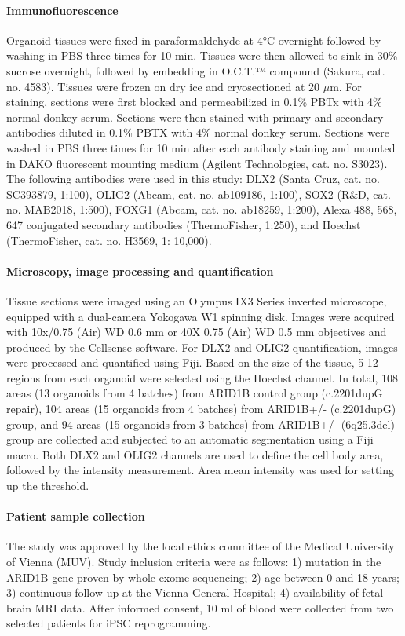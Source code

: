 \paragraph{Immunofluorescence}
Organoid tissues were fixed in paraformaldehyde at 4°C overnight followed by washing in PBS three times for 10 min. Tissues were then allowed to sink in 30\% sucrose overnight, followed by embedding in O.C.T.™ compound (Sakura, cat. no. 4583). Tissues were frozen on dry ice and cryosectioned at 20 $\mu$m. For staining, sections were first blocked and permeabilized in 0.1\% PBTx with 4\% normal donkey serum. Sections were then stained with primary and secondary antibodies diluted in 0.1\% PBTX with 4\% normal donkey serum. Sections were washed in PBS three times for 10 min after each antibody staining and mounted in DAKO fluorescent mounting medium (Agilent Technologies, cat. no. S3023). The following antibodies were used in this study: DLX2 (Santa Cruz, cat. no. SC393879, 1:100), OLIG2 (Abcam, cat. no. ab109186, 1:100), SOX2 (R\&D, cat. no. MAB2018, 1:500), FOXG1 (Abcam, cat. no. ab18259, 1:200), Alexa 488, 568, 647 conjugated secondary antibodies (ThermoFisher, 1:250), and Hoechst (ThermoFisher, cat. no. H3569, 1: 10,000).

\paragraph{Microscopy, image processing and quantification}
Tissue sections were imaged using an Olympus IX3 Series inverted microscope, equipped with a dual-camera Yokogawa W1 spinning disk. Images were acquired with 10x/0.75 (Air) WD 0.6 mm or 40X 0.75 (Air) WD 0.5 mm objectives and produced by the Cellsense software. 
For DLX2 and OLIG2 quantification, images were processed and quantified using Fiji. Based on the size of the tissue, 5-12 regions from each organoid were selected using the Hoechst channel. In total, 108 areas (13 organoids from 4 batches) from ARID1B control group (c.2201dupG repair), 104 areas (15 organoids from 4 batches) from ARID1B+/- (c.2201dupG) group, and 94 areas (15 organoids from 3 batches) from ARID1B+/- (6q25.3del) group are collected and subjected to an automatic segmentation using a Fiji macro. Both DLX2 and OLIG2 channels are used to define the cell body area, followed by the intensity measurement. Area mean intensity was used for setting up the threshold.   

\paragraph{Patient sample collection}
The study was approved by the local ethics committee of the Medical University of Vienna (MUV). Study inclusion criteria were as follows: 1) mutation in the ARID1B gene proven by whole exome sequencing; 2) age between 0 and 18 years; 3) continuous follow-up at the Vienna General Hospital; 4) availability of fetal brain MRI data. After informed consent, 10 ml of blood were collected from two selected patients for iPSC reprogramming.

